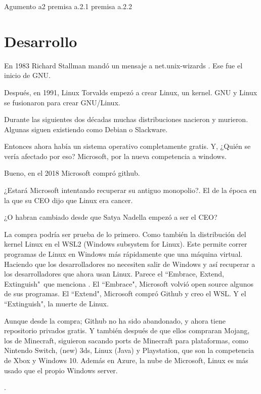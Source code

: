 \documentclass[12pt, twoside]{article}
\begin{document}
Agumento a2
premisa a.2.1
premisa a.2.2

\section{Desarrollo}%
\label{sec:Desarrollo}
En 1983 Richard Stallman mandó un mensaje a net.unix-wizards \citet[89]{faif}.
Ese fue el inicio de GNU.

Después, en 1991, Linux Torvalds empezó a crear Linux, un kernel.
GNU y Linux se fusionaron para crear GNU/Linux.

Durante las siguientes dos décadas muchas distribuciones nacieron y murieron.
Algunas siguen existiendo como Debian o Slackware. \citet{DISTROS}

Entonces ahora había un sistema operativo completamente gratis.
Y, ¿Quién se vería afectado por eso?
Microsoft, por la nueva competencia a windows. \citet{HALLO1}

Bueno, en el 2018 Microsoft compró github. \citet{GITHUB}

¿Estará Microsoft intentando recuperar su antiguo monopolio?.
El de la época en la que su CEO dijo que Linux era cancer. \citet{CANCER}

¿O habran cambiado desde que Satya Nadella empezó a ser el CEO?

La compra podría ser prueba de lo primero.
Como también la distribución del kernel Linux en el WSL2 (Windows subsystem for Linux). \citet{WSL2}
Este permite correr programas de Linux en Windows más rápidamente que una máquina virtual.
Haciendo que los desarrolladores no necesiten salir de Windows y así recuperar a los desarrolladores que ahora usan Linux. \citet{STACK}
Parece el ``Embrace, Extend, Extinguish"\ que menciona \citet{WSL2}.
El ``Embrace", Microsoft volvió open source algunos de sus programas.
El ``Extend", Microsoft compró Github y creo el WSL.
Y el ``Extinguish", la muerte de Linux.

Aunque desde la compra; Github no ha sido abandonado, y ahora tiene repositorio privados gratis.
Y también después de que ellos compraran Mojang, los de Minecraft, siguieron sacando ports de Minecraft para plataformas,
como Nintendo Switch, (new) 3ds, Linux (Java) y Playstation, que son la competencia de Xbox y Windows 10.
Además en Azure, la nube de Microsoft, Linux es más usado que el propio Windows server. \citet{AZURE}

\newpage
.
\vfill
\nocite{*}
\printbibliography
\end{document}
